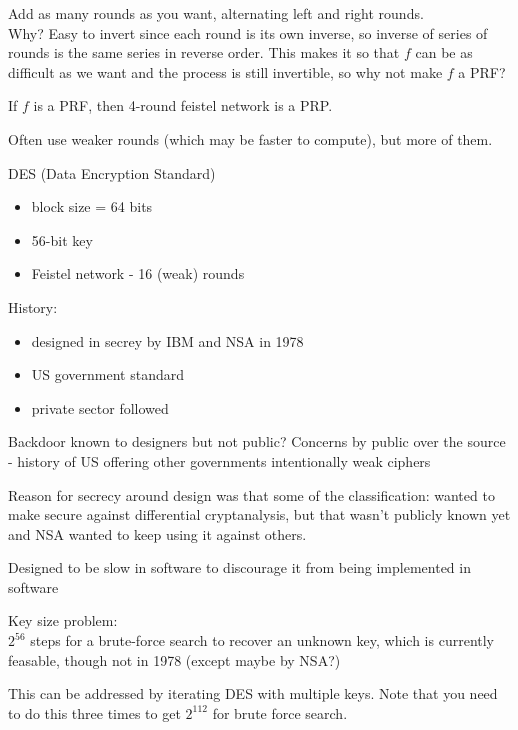 Add as many rounds as you want, alternating left and right rounds.\\

Why? Easy to invert since each round is its own inverse, so inverse of series
of rounds is the same series in reverse order. This makes it so that $f$ can be
as difficult as we want and the process is still invertible, so why not make $f$
a PRF?\\

\begin{theorem*}
If $f$ is a PRF, then 4-round feistel network is a PRP.
\end{theorem*}
Often use weaker rounds (which may be faster to compute), but more of them.

\begin{example}{DES (Data Encryption Standard)}
    \begin{itemize}
        \item block size = 64 bits
        \item 56-bit key
        \item Feistel network - 16 (weak) rounds
    \end{itemize}

    History:
    \begin{itemize}
        \item designed in secrey by IBM and NSA in 1978
        \item US government standard
        \item private sector followed
    \end{itemize}

    Backdoor known to designers but not public? Concerns by public over the
    source - history of US offering other governments intentionally weak ciphers

    Reason for secrecy around design was that some of the classification: wanted
    to make secure against differential cryptanalysis, but that wasn't publicly
    known yet and NSA wanted to keep using it against others.

    Designed to be slow in software to discourage it from being implemented in
    software

    Key size problem:\\
    $2^{56}$ steps for a brute-force search to recover an unknown key, which is
    currently feasable, though not in 1978 (except maybe by NSA?)

    This can be addressed by iterating DES with multiple keys. Note that you
    need to do this three times to get $2^{112}$ for brute force search.
\end{example}

